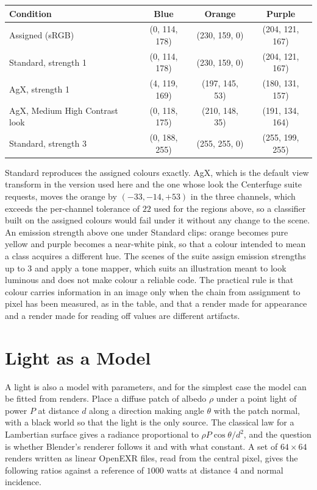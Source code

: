 \begin{center}
\begin{tabular}{@{}lccc@{}}
\toprule
Condition & Blue & Orange & Purple\\
\midrule
Assigned (sRGB) & (0, 114, 178) & (230, 159, 0) & (204, 121, 167)\\
Standard, strength 1 & (0, 114, 178) & (230, 159, 0) & (204, 121, 167)\\
AgX, strength 1 & (4, 119, 169) & (197, 145, 53) & (180, 131, 157)\\
AgX, Medium High Contrast look & (0, 118, 175) & (210, 148, 35) & (191, 134, 164)\\
Standard, strength 3 & (0, 188, 255) & (255, 255, 0) & (255, 199, 255)\\
\bottomrule
\end{tabular}
\end{center}

Standard reproduces the assigned colours exactly. AgX, which is the default view transform in the version used here and the one whose look the Centerfuge suite requests, moves the orange by $(-33,-14,+53)$ in the three channels, which exceeds the per-channel tolerance of $22$ used for the regions above, so a classifier built on the assigned colours would fail under it without any change to the scene. An emission strength above one under Standard clips: orange becomes pure yellow and purple becomes a near-white pink, so that a colour intended to mean a class acquires a different hue. The scenes of the suite assign emission strengths up to $3$ and apply a tone mapper, which suits an illustration meant to look luminous and does not make colour a reliable code. The practical rule is that colour carries information in an image only when the chain from assignment to pixel has been measured, as in the table, and that a render made for appearance and a render made for reading off values are different artifacts.

\section{Light as a Model}

A light is also a model with parameters, and for the simplest case the model can be fitted from renders. Place a diffuse patch of albedo $\rho$ under a point light of power $P$ at distance $d$ along a direction making angle $\theta$ with the patch normal, with a black world so that the light is the only source. The classical law for a Lambertian surface gives a radiance proportional to $\rho P\cos\theta/d^2$, and the question is whether Blender's renderer follows it and with what constant. A set of $64\times64$ renders written as linear OpenEXR files, read from the central pixel, gives the following ratios against a reference of $1000$ watts at distance $4$ and normal incidence.

